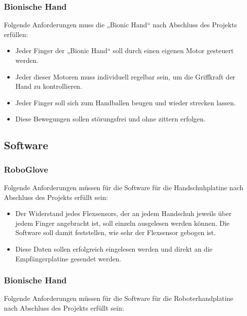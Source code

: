 \documentclass[11pt]{article}
\begin{document}
\subsubsection{Bionische Hand}
Folgende Anforderungen muss die „Bionic Hand“ nach Abschluss des Projekts erfüllen:

	\begin{itemize}
		\item Jeder Finger der „Bionic Hand“ soll durch einen eigenen Motor gesteuert werden.
		\item Jeder dieser Motoren muss individuell regelbar sein, um die Griffkraft der Hand zu kontrollieren.	
		\item Jeder Finger soll sich zum Handballen beugen und wieder strecken lassen.	
		\item Diese Bewegungen sollen störungsfrei und ohne zittern erfolgen.
	\end{itemize}

\subsection{Software}
\subsubsection{RoboGlove}
Folgende Anforderungen müssen für die Software für die Handschuhplatine nach Abschluss des Projekts erfüllt sein:

	\begin{itemize}
		\item Der Widerstand jedes Flexsensors, der an jedem Handschuh jeweils über jedem Finger angebracht ist, 
			  soll einzeln ausgelesen werden können. Die Software soll damit feststellen, wie sehr der Flexsensor 
			  gebogen ist.
		\item Diese Daten sollen erfolgreich eingelesen werden und direkt an die Empfängerplatine gesendet werden.
	\end{itemize}

\subsubsection{Bionische Hand}
Folgende Anforderungen müssen für die Software für die Roboterhandplatine nach Abschluss des Projekts erfüllt sein:
\end{document}
